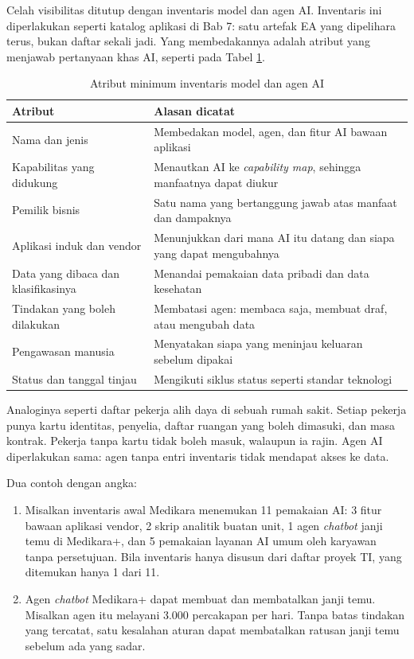 Celah visibilitas ditutup dengan inventaris model dan agen AI. Inventaris ini
diperlakukan seperti katalog aplikasi di Bab 7: satu artefak EA yang
dipelihara terus, bukan daftar sekali jadi. Yang membedakannya adalah atribut
yang menjawab pertanyaan khas AI, seperti pada Tabel \ref{tab:ch10-inventaris}.

\begin{table}[!htb]
  \centering
  \caption{Atribut minimum inventaris model dan agen AI}
  \label{tab:ch10-inventaris}
  \small
  \begin{tabularx}{\textwidth}{lX}
    \hline
    \textbf{Atribut} & \textbf{Alasan dicatat} \\
    \hline
    Nama dan jenis & Membedakan model, agen, dan fitur AI bawaan aplikasi \\
    \hline
    Kapabilitas yang didukung & Menautkan AI ke \textit{capability map}, sehingga manfaatnya dapat diukur \\
    \hline
    Pemilik bisnis & Satu nama yang bertanggung jawab atas manfaat dan dampaknya \\
    \hline
    Aplikasi induk dan vendor & Menunjukkan dari mana AI itu datang dan siapa yang dapat mengubahnya \\
    \hline
    Data yang dibaca dan klasifikasinya & Menandai pemakaian data pribadi dan data kesehatan \\
    \hline
    Tindakan yang boleh dilakukan & Membatasi agen: membaca saja, membuat draf, atau mengubah data \\
    \hline
    Pengawasan manusia & Menyatakan siapa yang meninjau keluaran sebelum dipakai \\
    \hline
    Status dan tanggal tinjau & Mengikuti siklus status seperti standar teknologi \\
    \hline
  \end{tabularx}
\end{table}

Analoginya seperti daftar pekerja alih daya di sebuah rumah sakit. Setiap
pekerja punya kartu identitas, penyelia, daftar ruangan yang boleh dimasuki,
dan masa kontrak. Pekerja tanpa kartu tidak boleh masuk, walaupun ia rajin.
Agen AI diperlakukan sama: agen tanpa entri inventaris tidak mendapat akses ke
data.

Dua contoh dengan angka:

\begin{enumerate}
  \item Misalkan inventaris awal Medikara menemukan 11 pemakaian AI: 3 fitur
        bawaan aplikasi vendor, 2 skrip analitik buatan unit, 1 agen
        \textit{chatbot} janji temu di Medikara+, dan 5 pemakaian layanan AI
        umum oleh karyawan tanpa persetujuan. Bila inventaris hanya disusun
        dari daftar proyek TI, yang ditemukan hanya 1 dari 11.
  \item Agen \textit{chatbot} Medikara+ dapat membuat dan membatalkan janji
        temu. Misalkan agen itu melayani 3.000 percakapan per hari. Tanpa
        batas tindakan yang tercatat, satu kesalahan aturan dapat membatalkan
        ratusan janji temu sebelum ada yang sadar.
\end{enumerate}

